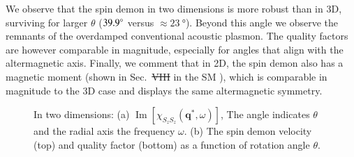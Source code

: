 \documentclass[aps,prl,reprint,twocolumns,superscriptaddress]{revtex4-2}
\DeclareMathOperator{\Imm}{Im}
\providecommand{\DIFaddtex}[1]{{\protect\color{blue}\uwave{#1}}} %
\providecommand{\DIFdeltex}[1]{{\protect\color{red}\sout{#1}}}                      %
\providecommand{\DIFaddbegin}{} %
\providecommand{\DIFaddend}{} %
\providecommand{\DIFdelbegin}{} %
\providecommand{\DIFdelend}{} %
\providecommand{\DIFadd}[1]{\texorpdfstring{\DIFaddtex{#1}}{#1}} %
\providecommand{\DIFdel}[1]{\texorpdfstring{\DIFdeltex{#1}}{}} %
\begin{document}
	
	We observe that the spin demon in two dimensions is more robust than in 3D, surviving for larger $\theta$ ($\SI{39.9}{\degree}$ versus $\approx\SI{23}{\degree}$). Beyond this angle we observe the remnants of the overdamped conventional acoustic plasmon. The quality factors are however comparable in magnitude, especially for angles that align with the altermagnetic axis. Finally, we comment that in 2D, the spin demon also has a magnetic moment (shown in Sec.~\DIFdelbegin \DIFdel{VIII }\DIFdelend \DIFaddbegin \DIFadd{IX }\DIFaddend in the SM \cite{Note1}), which is comparable in magnitude to the 3D case and displays the same altermagnetic symmetry.

	\begin{figure}
		\caption{In two dimensions: (a) $\Imm[\chi_{S_zS_z}(\bm q^*,\omega)]$, The angle indicates $\theta$ and the radial axis the frequency $\omega$. (b) The spin demon velocity (top) and quality factor (bottom) as a function of rotation angle  $\theta$. \label{fig:2D} }
	\end{figure}


	
	
\end{document}
